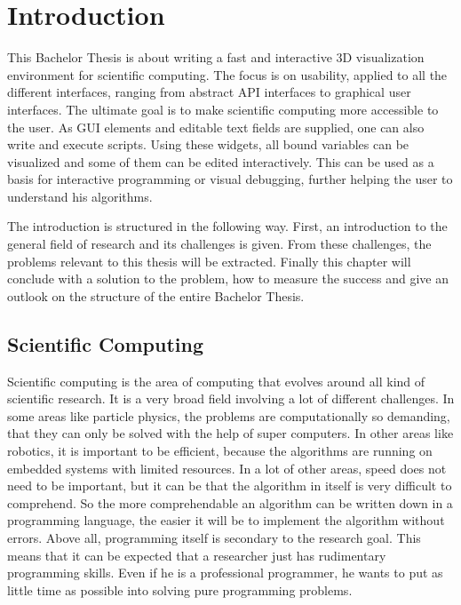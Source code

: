 \section{Introduction}
This Bachelor Thesis is about writing a fast and interactive 3D visualization environment for scientific computing. 
The focus is on usability, applied to all the different interfaces, ranging from abstract API interfaces to graphical user interfaces. 
The ultimate goal is to make scientific computing more accessible to the user.
As \ac{GUI} elements and editable text fields are supplied, one can also write and execute scripts.
Using these widgets, all bound variables can be visualized and some of them can be edited interactively. 
This can be used as a basis for interactive programming or visual debugging, further helping the user to understand his algorithms.

The introduction is structured in the following way.
First, an introduction to the general field of research and its challenges is given. 
From these challenges, the problems relevant to this thesis will be extracted.
Finally this chapter will conclude with a solution to the problem, how to measure the success and give an outlook on the structure of the entire Bachelor Thesis.


\subsection{Scientific Computing}
Scientific computing is the area of computing that evolves around all kind of scientific research.
It is a very broad field involving a lot of different challenges. 
In some areas like particle physics, the problems are computationally so demanding, that they can only be solved with the help of super computers.
In other areas like robotics, it is important to be efficient, because the algorithms are running on embedded systems with limited resources. 
In a lot of other areas, speed does not need to be important, but it can be that the algorithm in itself is very difficult to comprehend. 
So the more comprehendable an algorithm can be written down in a programming language, the easier it will be to implement the algorithm without errors.
Above all, programming itself is secondary to the research goal.
This means that it can be expected that a researcher just has rudimentary programming skills. Even if he is a professional programmer, he wants to put as little time as possible into solving pure programming problems.

